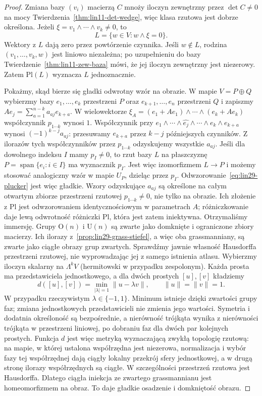 \begin{proof}
Zmiana bazy $(v_i)$ macierzą $C$ mnoży iloczyn
zewnętrzny przez $\det C\ne0$ na mocy
Twierdzenia~\ref{thm:lin11-det-wedge}, więc klasa
rzutowa jest dobrze określona. Jeżeli
$\xi=v_1\wedge\cdots\wedge v_k\ne0$, to
\[
 L=\{w\in V:w\wedge\xi=0\}.
\]
Wektory z $L$ dają zero przez powtórzenie czynnika.
Jeśli $w\notin L$, rodzina $(v_1,\ldots,v_k,w)$
jest liniowo niezależna; po uzupełnieniu do bazy
Twierdzenie~\ref{thm:lin11-zew-baza} mówi, że jej
iloczyn zewnętrzny jest niezerowy. Zatem
$\mathrm{Pl}(L)$ wyznacza $L$ jednoznacznie.

Pokażmy, skąd bierze się gładki odwrotny wzór na obrazie.
W mapie $V=P\oplus Q$ wybierzmy bazy
$e_1,\ldots,e_k$ przestrzeni $P$ oraz
$e_{k+1},\ldots,e_n$ przestrzeni $Q$ i zapiszmy
$Ae_j=\sum_{a=1}^{n-k}a_{aj}e_{k+a}$.
W wielowektorze
$\xi_A=(e_1+Ae_1)\wedge\cdots\wedge(e_k+Ae_k)$
współczynnik $p_{1\cdots k}$ wynosi $1$.
Współczynnik przy
$e_1\wedge\cdots\wedge\widehat{e_j}\wedge\cdots
\wedge e_k\wedge e_{k+a}$ wynosi
$(-1)^{k-j}a_{aj}$: przesuwamy $e_{k+a}$
przez $k-j$ późniejszych czynników.
Z ilorazów tych współczynników przez $p_{1\cdots k}$
odzyskujemy wszystkie $a_{aj}$.
Jeśli dla dowolnego indeksu $I$ mamy $p_I\ne0$,
to rzut bazy $L$ na płaszczyznę
$P=\operatorname{span}\{e_i:i\in I\}$ ma wyznacznik $p_I$.
Jest więc izomorfizmem $L\to P$ i możemy stosować
analogiczny wzór w mapie $U_P$, dzieląc przez $p_I$.
Odwzorowanie~\eqref{eq:lin29-plucker} jest więc gładkie.
Wzory odzyskujące $a_{aj}$ są określone na całym otwartym
zbiorze przestrzeni rzutowej $p_{1\cdots k}\ne0$, nie tylko
na obrazie. Ich złożenie z $\mathrm{Pl}$ jest odwzorowaniem identycznościowym
w parametrach $A$; różniczkowanie daje lewą odwrotność różniczki
$\mathrm{Pl}$, która jest zatem iniektywna.
Otrzymaliśmy immersję. Grupy $\mathrm O(n)$ i $\mathrm U(n)$
są zwarte jako domknięte i ograniczone zbiory macierzy.
Ich ilorazy z~\ref{prop:lin29-grass-stiefel}, a więc oba
grassmanniany, są zwarte jako ciągłe obrazy grup zwartych.
Sprawdźmy jawnie własność Hausdorffa przestrzeni rzutowej,
nie wyprowadzając jej z samego istnienia atlasu.
Wybierzmy iloczyn skalarny na $\Lambda^kV$ (hermitowski
w przypadku zespolonym). Każda prosta ma przedstawiciela
jednostkowego, a dla dwóch prostych $[u],[v]$ kładziemy
\[
 d([u],[v])=\min_{|\lambda|=1}\|u-\lambda v\|,
 \qquad \|u\|=\|v\|=1.
\]
W przypadku rzeczywistym $\lambda\in\{-1,1\}$.
Minimum istnieje dzięki zwartości grupy faz; zmiana
jednostkowych przedstawicieli nie zmienia jego wartości.
Symetria i dodatnia określoność są bezpośrednie,
a nierówność trójkąta wynika z nierówności trójkąta
w przestrzeni liniowej, po dobraniu faz dla dwóch par
kolejnych prostych. Funkcja $d$ jest więc metryką
wyznaczającą zwykłą topologię rzutową: na mapie,
w której ustalona współrzędna jest niezerowa,
normalizacja i wybór fazy tej współrzędnej dają
ciągły lokalny przekrój sfery jednostkowej,
a w drugą stronę ilorazy współrzędnych są ciągłe.
W szczególności przestrzeń rzutowa jest Hausdorffa. Dlatego
ciągła iniekcja ze zwartego grassmannianu jest
homeomorfizmem na obraz. To daje gładkie osadzenie i domkniętość obrazu.
\end{proof}

